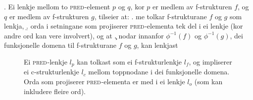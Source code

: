 \documentclass[12pt,a4paper,oneside,draft]{report}
\newcommand{\F}[2]{\textsc{#1}\ensuremath{_{#2}}}
\newcommand{\PRED}{\F{pred}{}}
\newcommand{\proj}[2]{\begin{tabular}{c}\footnotesize{#1}\\\normalsize{#2}\end{tabular}}
\newcommand{\ua}{\ensuremath{\uparrow}}
\newcommand{\da}{\ensuremath{\downarrow}}
\begin{document}
\ex. \label{krav:f-links} Ei lenkje mellom to \PRED{}-element $p$ og $q$, kor
      $p$ er medlem av f\hyp{}strukturen $f$, og $q$ er medlem av
      f\hyp{}strukturen $g$, tilseier at:
\a. \label{krav:f-links-substr} me tolkar f\hyp{}strukturane $f$ og $g$ som lenkja,
\b. \label{krav:f-links-words} orda i setningane som projiserer
     \PRED{}-elementa tek del i ei lenkje (kor andre
     ord kan vere involvert), og at
\c. \label{krav:f-links-domain} nodar innanfor $\phi^{-1}(f)$
     og $\phi^{-1}(g)$, dei funksjonelle domena til f\hyp{}strukturane $f$
     og $g$, kan lenkjast

 \begin{figure}[htp]
    \centering
    
    \caption{Ei \PRED{}-lenkje $l_p$ kan tolkast som ei f\hyp{}strukturlenkje
    $l_f$, og impliserer ei c\hyp{}strukturlenkje $l_c$ mellom toppnodane i
    dei funksjonelle domena. Orda som projiserer \PRED{}-elementa er med
    i ei lenkje $l_o$ (som kan inkludere fleire ord).}
   \label{fig:viss-PRED-så-f-og-c}
 \end{figure}
\end{document}
